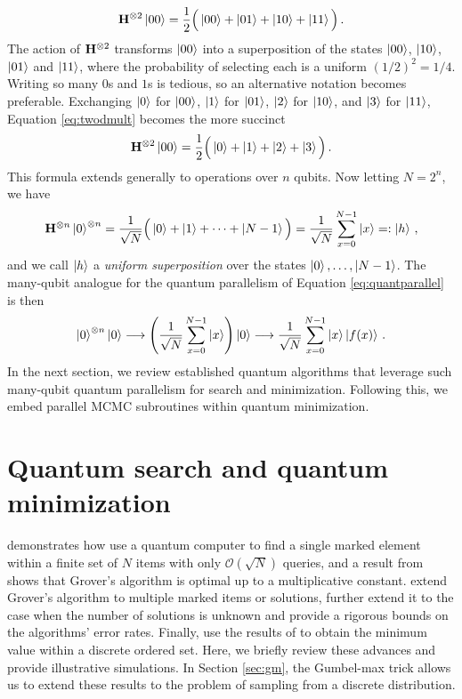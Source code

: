 \documentclass[12pt]{article} %
\begin{document}
\begin{align}\label{eq:twodmult}
\mathbf{H}^{\otimes2} \ket{00} = \frac{1}{2}\Big(\ket{00} + \ket{01} + \ket{10} + \ket{11}\Big) \, .
\end{align}
The action of $\mathbf{H}^{\otimes2}$ transforms $\ket{00}$ into a superposition of the states $\ket{00}$, $\ket{10}$, $\ket{01}$ and $\ket{11}$, where the probability of selecting each is a uniform $(1/2)^2=1/4$. Writing so many $0$s and $1$s is tedious, so an alternative notation becomes preferable. Exchanging $\ket{0}$ for $\ket{00}$, $\ket{1}$ for $\ket{01}$, $\ket{2}$ for $\ket{10}$, and $\ket{3}$ for $\ket{11}$, Equation \eqref{eq:twodmult} becomes the more succinct
\begin{align*}
\mathbf{H}^{\otimes2} \ket{00} = \frac{1}{2}\Big(\ket{0} + \ket{1} + \ket{2} + \ket{3}\Big) \, .
\end{align*}
This formula extends generally to operations over $n$ qubits.  Now letting $N=2^n$, we have
\begin{align*}%
\H^{\otimes n} \ket{0}^{\otimes n} = \frac{1}{\sqrt{N}}\Big(\ket{0} + \ket{1} + \dots + \ket{N-1}\Big) =  \frac{1}{\sqrt{N}} \sum_{x=0}^{N-1} \ket{x}=:\ket{h} \, ,
\end{align*}
and we call $\ket{h}$ a \emph{uniform superposition} over the states $\ket{0},\dots,\ket{N-1}$. The many-qubit analogue for the quantum parallelism of Equation \eqref{eq:quantparallel} is then
\begin{align*}%
\ket{0}^{\otimes n}\ket{0} \longrightarrow \left(\frac{1}{\sqrt{N}} \sum_{x=0}^{N-1} \ket{x} \right) \ket{0}  \longrightarrow \frac{1}{\sqrt{N}} \sum_{x=0}^{N-1} \ket{x} \ket{f(x)} \, .
\end{align*}
In the next section, we review established quantum algorithms that leverage such many-qubit quantum parallelism for search and minimization.  Following this, we embed parallel MCMC subroutines within quantum minimization.

\section{Quantum search and quantum minimization}\label{sec:qmin}

\citet{grover1996fast} demonstrates how use a quantum computer to find a single marked element within a finite set of $N$ items with only $\mathcal{O}(\sqrt{N})$ queries, and a result from \citet{bennett1997strengths} shows that Grover's algorithm is optimal up to a multiplicative constant. \citet{boyer1998tight} extend Grover's algorithm to multiple marked items or solutions, further extend it to the case when the number of solutions is unknown and provide a rigorous bounds on the algorithms' error rates.  Finally, \citet{durr1996quantum} use the results of \citet{boyer1998tight} to obtain the minimum value within a discrete ordered set.  Here, we briefly review these advances and provide illustrative simulations.  In Section \ref{sec:gm}, the Gumbel-max trick allows us to extend these results to the problem of sampling from a discrete distribution.
\end{document}
